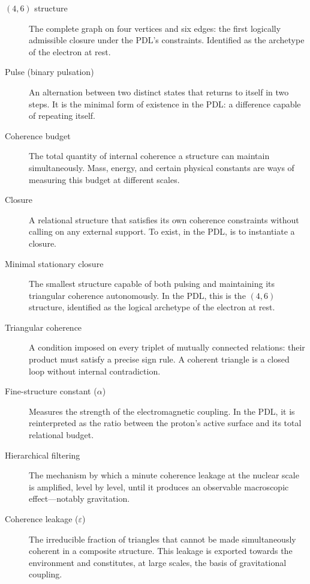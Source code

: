 \documentclass[12pt, a4paper, openright]{book}
\begin{document}
\begin{description}

\item[$(4,6)$ structure] The complete graph on four vertices and six edges: the first logically admissible closure under the PDL's constraints. Identified as the archetype of the electron at rest.

\item[Pulse (binary pulsation)] An alternation between two distinct states that returns to itself in two steps. It is the minimal form of existence in the PDL: a difference capable of repeating itself.

\item[Coherence budget] The total quantity of internal coherence a structure can maintain simultaneously. Mass, energy, and certain physical constants are ways of measuring this budget at different scales.

\item[Closure] A relational structure that satisfies its own coherence constraints without calling on any external support. To exist, in the PDL, is to instantiate a closure.

\item[Minimal stationary closure] The smallest structure capable of both pulsing and maintaining its triangular coherence autonomously. In the PDL, this is the $(4,6)$ structure, identified as the logical archetype of the electron at rest.

\item[Triangular coherence] A condition imposed on every triplet of mutually connected relations: their product must satisfy a precise sign rule. A coherent triangle is a closed loop without internal contradiction.

\item[Fine-structure constant ($\alpha$)] Measures the strength of the electromagnetic coupling. In the PDL, it is reinterpreted as the ratio between the proton's active surface and its total relational budget.

\item[Hierarchical filtering] The mechanism by which a minute coherence leakage at the nuclear scale is amplified, level by level, until it produces an observable macroscopic effect---notably gravitation.

\item[Coherence leakage ($\varepsilon$)] The irreducible fraction of triangles that cannot be made simultaneously coherent in a composite structure. This leakage is exported towards the environment and constitutes, at large scales, the basis of gravitational coupling.


\end{description}
\end{document}
